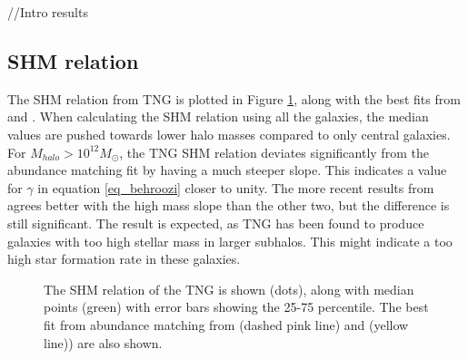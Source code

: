 
//Intro results


\subsection{SHM relation}
The SHM relation from TNG is plotted in Figure \ref{shmr_res}, along with the best fits from \textcite{Behroozi2013} and \textcite{Zanisi2019}.
When calculating the SHM relation using all the galaxies, the median values are pushed towards lower halo masses compared to only central galaxies. For $M_{halo} > 10^{12} M_{\odot}$, the TNG SHM relation deviates significantly from the abundance matching fit by having a much steeper slope. This indicates a value for $\gamma$ in equation \ref{eq_behroozi} closer to unity. The more recent results from \textcite{Zanisi2019} agrees better with the high mass slope than the other two, but the difference is still significant. The result is expected, as TNG has been found to produce galaxies with too high stellar mass in larger subhalos. This might indicate a too high star formation rate in these galaxies.


\begin{figure}
    \centering
    \caption{The SHM relation of the TNG is shown (dots), along with median points (green) with error bars showing the 25-75 percentile. The best fit from abundance matching from \textcite{Behroozi2013} (dashed pink line) and \textcite{Zanisi2019} (yellow line)) are also shown.} 
    \label{shmr_res}
\end{figure}


